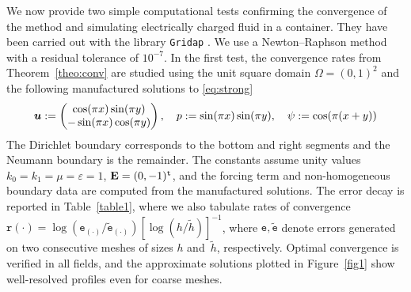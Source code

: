 We now provide two simple computational tests confirming the convergence of the method and  simulating electrically charged fluid in a container. They have been carried out with the  library \texttt{Gridap} \cite{badia22}. We use a  Newton--Raphson method with a residual tolerance of $10^{-7}$. 
In the first test, the convergence rates from Theorem~\ref{theo:conv} are studied using the  unit square domain $\Omega = (0,1)^2$ and  the following manufactured solutions to \eqref{eq:strong}
\begin{align*}
\bu%
:= \begin{pmatrix}
\cos(\pi x)\sin(\pi y)\\
-\sin(\pi x)\cos(\pi y)\end{pmatrix}, \quad   
p%
:=\sin(\pi x)\sin(\pi y), \quad \psi %
:= \cos(\pi(x+y))\end{align*}
The Dirichlet boundary corresponds to the bottom and right segments and the Neumann boundary is the remainder. The constants assume unity values $k_0 = k_1 = \mu = \varepsilon = 1$, $\mathbf{E} = (0,-1)^{\tt t}$, and the  forcing term and non-homogeneous boundary data are computed from the manufactured solutions. The error decay is reported in Table~\ref{table1}, where we also tabulate rates of convergence  $\texttt{r}(\cdot)  =\log(\texttt{e}_{(\cdot)}/\tilde{\texttt{e}}_{(\cdot)})[\log(h/\tilde{h})]^{-1}$, where $\texttt{e},\tilde{\texttt{e}}$ denote errors generated on two consecutive  meshes of sizes $h$ and~$\tilde{h}$, respectively. Optimal convergence is verified in all fields, and the approximate solutions plotted in Figure~\ref{fig1} show well-resolved profiles even for coarse meshes. 

